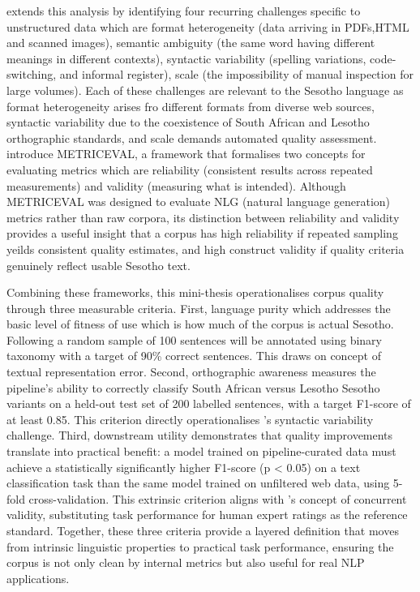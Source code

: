 \documentclass[12pt]{ThesisRU}
\begin{document}
\citet{wang2026modernizing} extends this analysis by identifying four recurring challenges specific to unstructured data which are format heterogeneity (data arriving in PDFs,HTML and scanned images), semantic ambiguity (the same word having different meanings in different contexts), syntactic variability (spelling variations, code-switching, and informal register), scale (the impossibility of manual inspection for large volumes). Each of these challenges are relevant to the Sesotho language as format heterogeneity arises fro different formats from diverse web sources, syntactic variability due to the coexistence of South African and Lesotho orthographic standards, and scale demands  automated quality assessment. \citet{xiao2023evaluating}  introduce METRICEVAL, a framework that formalises two concepts for evaluating metrics which are reliability (consistent results across repeated measurements) and validity (measuring what is intended). Although METRICEVAL was designed to evaluate NLG (natural language generation) metrics rather than raw corpora, its distinction between reliability and validity provides a useful insight that a corpus has high reliability if repeated sampling yeilds consistent quality estimates, and high construct validity if quality criteria genuinely reflect usable Sesotho text.

Combining these frameworks, this mini-thesis operationalises corpus quality through three measurable criteria. First, language purity which addresses  the basic level of fitness of use which is how much of the corpus is actual Sesotho. Following \citet{kreutzer-etal-2022-quality} a random sample of 100 sentences will be annotated using binary taxonomy with a target of 90\% correct sentences. This draws on \citet{hurtado2022documents} concept of textual representation error.  Second, orthographic awareness measures the pipeline's ability to correctly classify South African versus Lesotho Sesotho variants on a held-out test set of 200 labelled sentences, with a target F1-score of at least 0.85. This criterion directly operationalises \citet{wang2026modernizing}'s syntactic variability challenge. Third, downstream utility demonstrates that quality improvements translate into practical benefit: a model trained on pipeline-curated data must achieve a statistically significantly higher F1-score (p < 0.05) on a text classification task than the same model trained on unfiltered web data, using 5-fold cross-validation. This extrinsic criterion aligns with \citet{xiao2023evaluating}'s concept of concurrent validity, substituting task performance for human expert ratings as the reference standard. Together, these three criteria provide a layered definition that moves from intrinsic linguistic properties to practical task performance, ensuring the corpus is not only clean by internal metrics but also useful for real NLP applications.
\end{document}
